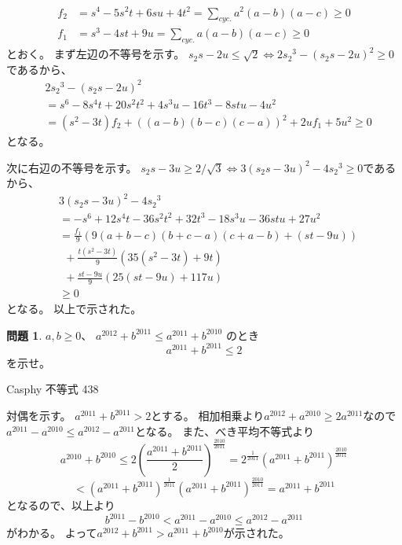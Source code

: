 \documentclass[uplatex, a5paper]{jsarticle}
\makeatletter
\theoremstyle{definition}
\newtheorem{prob}{問題}
\renewenvironment{proof}[1][\proofname]{
  \pushQED{\qed}%
  \normalfont \topsep6\p@\@plus6\p@\relax
  \trivlist
  \item[\hskip\labelsep
    #1\@addpunct{\textbf{.}}]\ignorespaces
}{%
  \popQED\endtrivlist\@endpefalse
}
\providecommand{\proofname}{証明}
\def\qed{\hfill $\Box$}
\makeatother
\begin{document}
\begin{proof}
  \begin{align*}
    f_2 &= s^4-5s^2t+6su+4t^2 = \sum_{cyc.} a^2(a-b)(a-c) \geq 0  \\
    f_1 &= s^3 -4st +9u = \sum_{cyc.}a(a-b)(a-c) \geq 0
  \end{align*}
  とおく。
  まず左辺の不等号を示す。
  \(s_2s -2u \leq \sqrt{2} \Leftrightarrow 2{s_2}^3 - (s_2s-2u)^2 \geq 0\)であるから、
  \begin{align*}
    &2{s_2}^3 - (s_2s-2u)^2 \\
    &= s^6 -8s^4t+20s^2t^2+4s^3u-16t^3-8stu-4u^2 \\
    &= (s^2-3t)f_2 + \left( (a-b)(b-c)(c-a) \right) ^2 + 2uf_1 + 5u^2 \geq 0
  \end{align*}
  となる。

  次に右辺の不等号を示す。
  \(s_2s-3u \geq 2/ \sqrt{3} \Leftrightarrow 3(s_2s-3u)^2 -4{s_2}^3 \geq 0\)であるから、
  \begin{align*}
    &3(s_2s-3u)^2 -4{s_2}^3 \\
    &= -s^6 + 12s^4t - 36s^2t^2 + 32t^3 - 18s^3u -36stu + 27u^2 \\
    &= \frac{f_1}{9}\left( 9(a+b-c)(b+c-a)(c+a-b) + (st-9u) \right) \\
    &\ \ + \frac{t(s^2-3t)}{9}\left( 35(s^2-3t) + 9t \right) \\
    &\ \ + \frac{st-9u}{9}\left( 25(st-9u) + 117u \right) \\
    &\geq 0
  \end{align*}
  となる。
  以上で示された。
\end{proof}










\newpage

\begin{prob}
  \(a,b \geq 0\)、
  \(a^{2012} + b^{2011} \leq a^{2011} + b^{2010}\)
  のとき
  \[
  a^{2011} + b^{2011} \leq 2
  \]
  を示せ。
  \begin{flushright}
    Casphy 不等式 438
  \end{flushright}
\end{prob}


\begin{proof}
  対偶を示す。
  \(a^{2011} + b^{2011} > 2\)とする。
  相加相乗より\(a^{2012}+a^{2010} \geq 2a^{2011}\)なので\(a^{2011}-a^{2010} \leq a^{2012}-a^{2011}\)となる。
  また、べき平均不等式より
  \[
  a^{2010} + b^{2010}
  \leq 2\left( \frac{a^{2011} + b^{2011} }{2} \right)^{\frac{2010}{2011}}
  = 2^{\frac{1}{2011}} \left( a^{2011} + b^{2011} \right) ^{\frac{2010}{2011}}
  \]
  \[
  < \left( a^{2011} + b^{2011} \right)^{\frac{1}{2011}}
  \left( a^{2011} + b^{2011} \right) ^{\frac{2010}{2011}}
  = a^{2011} + b^{2011}
  \]
  となるので、以上より
  \[
  b^{2011}-b^{2010} < a^{2011} - a^{2010} \leq a^{2012} - a^{2011}
  \]
  がわかる。
  よって\(a^{2012} + b^{2011} > a^{2011} + b^{2010}\)が示された。
\end{proof}
\end{document}
